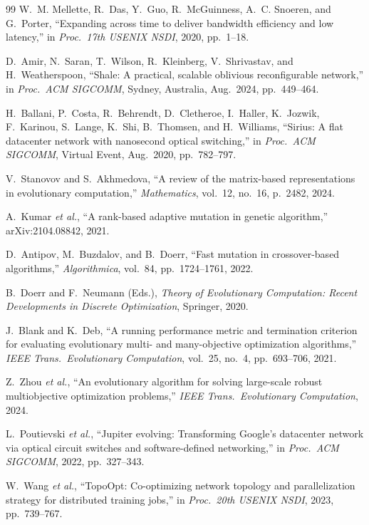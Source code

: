 \documentclass{article}
\begin{document}
    \begin{thebibliography}{99}
        W.~M. Mellette, R.~Das, Y.~Guo, R.~McGuinness, A.~C. Snoeren, and G.~Porter,
        ``Expanding across time to deliver bandwidth efficiency and low latency,''
        in \emph{Proc.\ 17th USENIX NSDI}, 2020, pp.~1--18.

        D.~Amir, N.~Saran, T.~Wilson, R.~Kleinberg, V.~Shrivastav, and H.~Weatherspoon,
        ``Shale: A practical, scalable oblivious reconfigurable network,''
        in \emph{Proc.\ ACM SIGCOMM}, Sydney, Australia, Aug.\ 2024, pp.~449--464.

        H.~Ballani, P.~Costa, R.~Behrendt, D.~Cletheroe, I.~Haller, K.~Jozwik, F.~Karinou, S.~Lange, K.~Shi, B.~Thomsen, and H.~Williams,
        ``Sirius: A flat datacenter network with nanosecond optical switching,''
        in \emph{Proc.\ ACM SIGCOMM}, Virtual Event, Aug.\ 2020, pp.~782--797.

        V.~Stanovov and S.~Akhmedova,
        ``A review of the matrix-based representations in evolutionary computation,''
        \emph{Mathematics}, vol.~12, no.~16, p.~2482, 2024.

        A.~Kumar \emph{et al.},
        ``A rank-based adaptive mutation in genetic algorithm,''
        arXiv:2104.08842, 2021.

        D.~Antipov, M.~Buzdalov, and B.~Doerr,
        ``Fast mutation in crossover-based algorithms,''
        \emph{Algorithmica}, vol.~84, pp.~1724--1761, 2022.

        B.~Doerr and F.~Neumann (Eds.),
        \emph{Theory of Evolutionary Computation: Recent Developments in Discrete Optimization},
        Springer, 2020.

        J.~Blank and K.~Deb,
        ``A running performance metric and termination criterion for evaluating evolutionary multi- and many-objective optimization algorithms,''
        \emph{IEEE Trans.\ Evolutionary Computation}, vol.~25, no.~4, pp.~693--706, 2021.

        Z.~Zhou \emph{et al.},
        ``An evolutionary algorithm for solving large-scale robust multiobjective optimization problems,''
        \emph{IEEE Trans.\ Evolutionary Computation}, 2024.

        L.~Poutievski \emph{et al.},
        ``Jupiter evolving: Transforming Google's datacenter network via optical circuit switches and software-defined networking,''
        in \emph{Proc.\ ACM SIGCOMM}, 2022, pp.~327--343.

        W.~Wang \emph{et al.},
        ``TopoOpt: Co-optimizing network topology and parallelization strategy for distributed training jobs,''
        in \emph{Proc.\ 20th USENIX NSDI}, 2023, pp.~739--767.
    \end{thebibliography}
\end{document}
